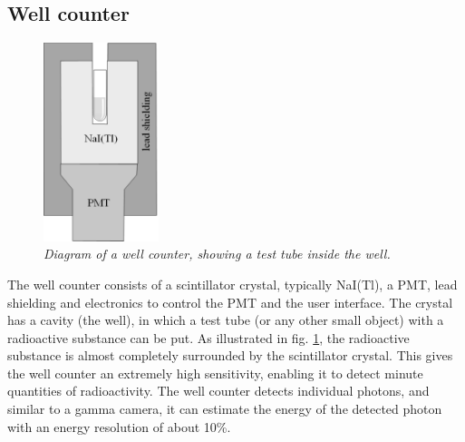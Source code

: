 \documentclass[11pt,oneside]{article}
\begin{document}
\subsection{Well counter}
\begin{figure}[tb]
\centering
\includegraphics[width=0.3\textwidth]{figs/fig_wellcounter.pdf}
\caption{\label{fig:wellcounter} \emph{Diagram of a well counter, showing a
    test tube inside the well.}}
\end{figure}
The well counter consists of a scintillator crystal, typically
NaI(Tl), a PMT, lead shielding and electronics to control the PMT and
the user interface. The crystal has a cavity (the well), in which a
test tube (or any other small object) with a radioactive substance can
be put. As illustrated in fig. \ref{fig:wellcounter}, the radioactive
substance is almost completely surrounded by the scintillator
crystal. This gives the well counter an extremely high sensitivity,
enabling it to detect minute quantities of radioactivity. The well
counter detects individual photons, and similar to a gamma camera, it
can estimate the energy of the detected photon with an energy
resolution of about 10\%.
\end{document}
